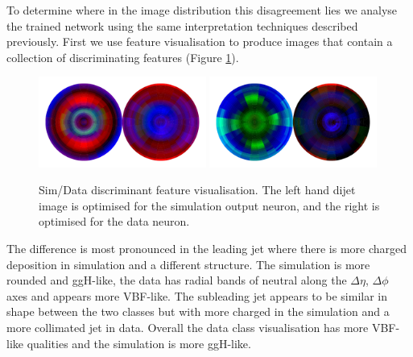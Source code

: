 To determine where in the image distribution this disagreement lies we analyse the trained network using the same interpretation techniques described previously. 
First we use feature visualisation to produce images that contain a collection of discriminating features (Figure \ref{fig:event_categorisation:zee_data_sim_feature_vis}).
\begin{figure}[h!]
    \begin{center}
        \includegraphics[width=0.49\textwidth]{figures/event_selection/zee_norm_logits0.pdf}
        \includegraphics[width=0.49\textwidth]{figures/event_selection/zee_norm_logits1.pdf}
    \end{center}
    \caption{Sim/Data discriminant feature visualisation. The left hand dijet image is optimised for the simulation output neuron, and the right is optimised for the data neuron.} 
    \label{fig:event_categorisation:zee_data_sim_feature_vis}
\end{figure}

The difference is most pronounced in the leading jet where there is more charged \pt deposition in simulation and a different structure. The simulation is more rounded and ggH-like, the data has radial bands of neutral \pt along the $\Delta\eta$, $\Delta\phi$ axes and appears more VBF-like.   
The subleading jet appears to be similar in shape between the two classes but with more charged \pt in the simulation and a more collimated jet in data. Overall the data class visualisation has more VBF-like qualities and the simulation is more ggH-like. 

